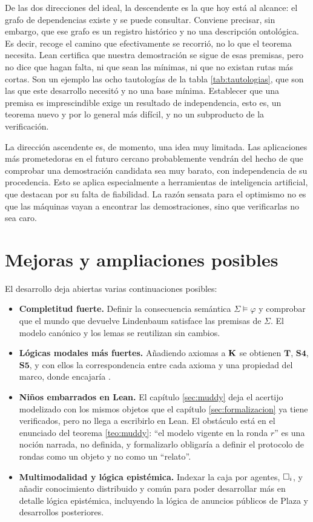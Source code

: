 De las dos direcciones del ideal, la descendente es la que hoy está al alcance: el grafo de dependencias existe y se puede consultar. Conviene precisar, sin embargo, que ese grafo es un registro histórico y no una descripción ontológica. Es decir, recoge el camino que efectivamente se recorrió, no lo que el teorema necesita. Lean certifica que nuestra demostración se sigue de esas premisas, pero no dice que hagan falta, ni que sean las mínimas, ni que no existan rutas más cortas. Son un ejemplo las ocho tautologías de la tabla \ref{tab:tautologias}, que son las que este desarrollo necesitó y no una base mínima. Establecer que una premisa es imprescindible exige un resultado de independencia, esto es, un teorema nuevo y por lo general más difícil, y no un subproducto de la verificación.

La dirección ascendente es, de momento, una idea muy limitada. Las aplicaciones más prometedoras en el futuro cercano probablemente vendrán del hecho de que comprobar una demostración candidata sea muy barato, con independencia de su procedencia. Esto se aplica especialmente a herramientas de inteligencia artificial, que destacan por su falta de fiabilidad. La razón sensata para el optimismo no es que las máquinas vayan a encontrar las demostraciones, sino que verificarlas no sea caro.

\section{Mejoras y ampliaciones posibles}\label{mejoras}

El desarrollo deja abiertas varias continuaciones posibles:

\begin{itemize}
  \item \textbf{Completitud fuerte.} Definir la consecuencia semántica $\Sigma \vDash \varphi$ y comprobar que el mundo que devuelve Lindenbaum satisface las premisas de $\Sigma$. El modelo canónico y los lemas se reutilizan sin cambios.

  \item \textbf{Lógicas modales más fuertes.} Añadiendo axiomas a $\mathbf{K}$ se obtienen $\mathbf{T}$, $\mathbf{S4}$, $\mathbf{S5}$, y con ellos la correspondencia entre cada axioma y una propiedad del marco, donde encajaría .

  \item \textbf{Niños embarrados en Lean.} El capítulo \ref{sec:muddy} deja el acertijo modelizado con los mismos objetos que el capítulo \ref{sec:formalizacion} ya tiene verificados, pero no llega a escribirlo en Lean. El obstáculo está en el enunciado del teorema \ref{teo:muddy}: ``el modelo vigente en la ronda $r$'' es una noción narrada, no definida, y formalizarlo obligaría a definir el protocolo de rondas como un objeto y no como un ``relato''.

  \item \textbf{Multimodalidad y lógica epistémica.} Indexar la caja por agentes, $\square_i$, y añadir conocimiento distribuido y común para poder desarrollar más en detalle lógica epistémica, incluyendo la lógica de anuncios públicos de Plaza \cite{plaza} y desarrollos posteriores.
\end{itemize}